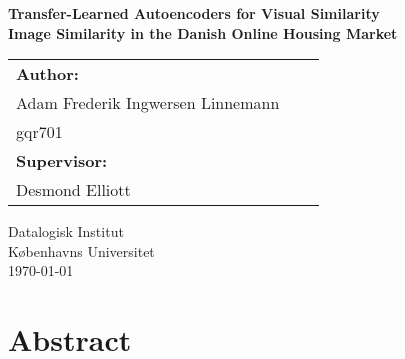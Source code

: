 \documentclass[a4paper]{article}
\begin{document}
	\AddToShipoutPicture*{\BackgroundPic}
	\begin{titlepage}
		\thispagestyle{empty}
		\vspace*{5cm}
		\begin{center}
			\Huge \textbf{Transfer-Learned Autoencoders for Visual Similarity} \\
      \LARGE \textbf{Image Similarity in the Danish Online Housing Market} \\
		\end{center}
		\vspace*{3.5cm}
		\begin{flushleft}

		\begin{table}[h!]
			\begin{tabular}{lll}	
	  \textbf{Author:} \\  Adam Frederik Ingwersen Linnemann \\ gqr701 \\ 
	  \textbf{Supervisor:} \\ Desmond Elliott 
			\end{tabular}
		\end{table}
			\vspace{3mm}
			\vspace{3mm}
			Datalogisk  Institut\\
			Københavns Universitet\\
			\vspace{3mm}
			\today\\

		\end{flushleft}
	\end{titlepage}

	\title{}
	\author{}

	\newpage
\newpage




\section*{Abstract}

\end{document}

